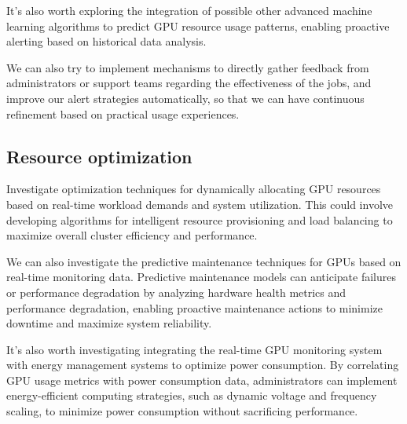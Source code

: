 It's also worth exploring the integration of possible other advanced machine learning algorithms to predict GPU resource usage patterns, enabling proactive alerting based on historical data analysis.

We can also try to implement mechanisms to directly gather feedback from administrators or support teams regarding the effectiveness of the jobs, and improve our alert strategies automatically, so that we can have continuous refinement based on practical usage experiences.

\subsection{Resource optimization}
Investigate optimization techniques for dynamically allocating GPU resources based on real-time workload demands and system utilization. This could involve developing algorithms for intelligent resource provisioning and load balancing to maximize overall cluster efficiency and performance.

We can also investigate the predictive maintenance techniques for GPUs based on real-time monitoring data. Predictive maintenance models can anticipate failures or performance degradation by analyzing hardware health metrics and performance degradation, enabling proactive maintenance actions to minimize downtime and maximize system reliability.

It's also worth investigating integrating the real-time GPU monitoring system with energy management systems to optimize power consumption. By correlating GPU usage metrics with power consumption data, administrators can implement energy-efficient computing strategies, such as dynamic voltage and frequency scaling, to minimize power consumption without sacrificing performance.

